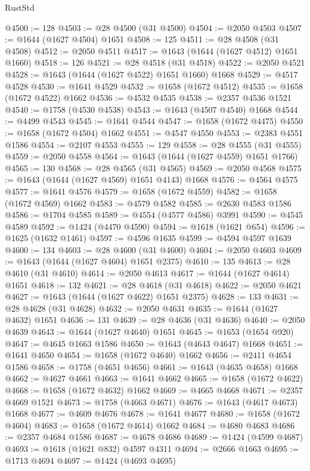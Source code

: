 \begin{lexlean}{RustStd}
\begin{coremodule}
@4500 := 128
@4503 := @28 @4500 (@31 @4500)
@4504 := @2050 @4503
@4507 := @1644 (@1627 @4504) @1651
@4508 := 125
@4511 := @28 @4508 (@31 @4508)
@4512 := @2050 @4511
@4517 := @1643 (@1644 (@1627 @4512) @1651 @1660)
@4518 := 126
@4521 := @28 @4518 (@31 @4518)
@4522 := @2050 @4521
@4528 := @1643 (@1644 (@1627 @4522) @1651 @1660) @1668
@4529 := @4517 @4528
@4530 := @1641 @4529
@4532 := @1658 (@1672 @4512)
@4535 := @1658 (@1672 @4522) @1662
@4536 := @4532 @4535
@4538 := @2357 @4536 @1521
@4540 := @1758 (@4530 @4538)
@4543 := @1643 (@4507 @4540) @1668
@4544 := @4499 @4543
@4545 := @1641 @4544
@4547 := @1658 (@1672 @4475)
@4550 := @1658 (@1672 @4504) @1662
@4551 := @4547 @4550
@4553 := @2383 @4551 @1586
@4554 := @2107 @4553
@4555 := 129
@4558 := @28 @4555 (@31 @4555)
@4559 := @2050 @4558
@4564 := @1643 (@1644 (@1627 @4559) @1651 @1766)
@4565 := 130
@4568 := @28 @4565 (@31 @4565)
@4569 := @2050 @4568
@4575 := @1643 (@1644 (@1627 @4569) @1651 @4143) @1668
@4576 := @4564 @4575
@4577 := @1641 @4576
@4579 := @1658 (@1672 @4559)
@4582 := @1658 (@1672 @4569) @1662
@4583 := @4579 @4582
@4585 := @2630 @4583 @1586
@4586 := @1704 @4585
@4589 := @4554 (@4577 @4586) @3991
@4590 := @4545 @4589
@4592 := @1424 (@4470 @4590)
@4594 := @1618 (@1621 @654)
@4596 := @1625 (@1632 @1461)
@4597 := @4596 @1635
@4599 := @4594 @4597 @1639
@4600 := 134
@4603 := @28 @4600 (@31 @4600)
@4604 := @2050 @4603
@4609 := @1643 (@1644 (@1627 @4604) @1651 @2375)
@4610 := 135
@4613 := @28 @4610 (@31 @4610)
@4614 := @2050 @4613
@4617 := @1644 (@1627 @4614) @1651
@4618 := 132
@4621 := @28 @4618 (@31 @4618)
@4622 := @2050 @4621
@4627 := @1643 (@1644 (@1627 @4622) @1651 @2375)
@4628 := 133
@4631 := @28 @4628 (@31 @4628)
@4632 := @2050 @4631
@4635 := @1644 (@1627 @4632) @1651
@4636 := 131
@4639 := @28 @4636 (@31 @4636)
@4640 := @2050 @4639
@4643 := @1644 (@1627 @4640) @1651
@4645 := @1653 (@1654 @920)
@4647 := @4645 @1663 @1586
@4650 := @1643 (@4643 @4647) @1668
@4651 := @1641 @4650
@4654 := @1658 (@1672 @4640) @1662
@4656 := @2411 @4654 @1586
@4658 := @1758 (@4651 @4656)
@4661 := @1643 (@4635 @4658) @1668
@4662 := @4627 @4661
@4663 := @1641 @4662
@4665 := @1658 (@1672 @4622)
@4668 := @1658 (@1672 @4632) @1662
@4669 := @4665 @4668
@4671 := @2357 @4669 @1521
@4673 := @1758 (@4663 @4671)
@4676 := @1643 (@4617 @4673) @1668
@4677 := @4609 @4676
@4678 := @1641 @4677
@4680 := @1658 (@1672 @4604)
@4683 := @1658 (@1672 @4614) @1662
@4684 := @4680 @4683
@4686 := @2357 @4684 @1586
@4687 := @4678 @4686
@4689 := @1424 (@4599 @4687)
@4693 := @1618 (@1621 @832) @4597 @4311
@4694 := @2666 @1663
@4695 := @1713 @4694
@4697 := @1424 (@4693 @4695)

\end{coremodule}
\end{lexlean}
